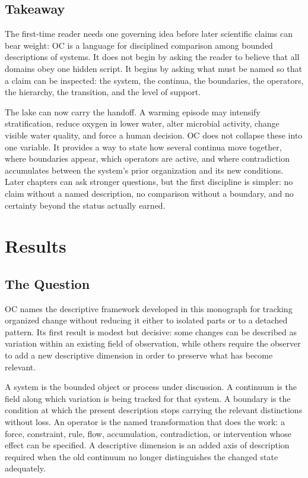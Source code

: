 \documentclass[11pt,a4paper,openany]{book}
\begin{document}
\subsection{Takeaway}
The first-time reader needs one governing idea before later scientific claims can bear weight: OC is a language for disciplined comparison among bounded descriptions of systems. It does not begin by asking the reader to believe that all domains obey one hidden script. It begins by asking what must be named so that a claim can be inspected: the system, the continua, the boundaries, the operators, the hierarchy, the transition, and the level of support. \cite{wilson_renormalization,landau_stat_physics}\par
The lake can now carry the handoff. A warming episode may intensify stratification, reduce oxygen in lower water, alter microbial activity, change visible water quality, and force a human decision. OC does not collapse these into one variable. It provides a way to state how several continua move together, where boundaries appear, which operators are active, and where contradiction accumulates between the system's prior organization and its new conditions. Later chapters can ask stronger questions, but the first discipline is simpler: no claim without a named description, no comparison without a boundary, and no certainty beyond the status actually earned.\par
\section{Results}
\subsection{The Question}
OC names the descriptive framework developed in this monograph for tracking organized change without reducing it either to isolated parts or to a detached pattern. Its first result is modest but decisive: some changes can be described as variation within an existing field of observation, while others require the observer to add a new descriptive dimension in order to preserve what has become relevant. \cite{landau_stat_physics,prigogine_dissipative}\par
A system is the bounded object or process under discussion. A continuum is the field along which variation is being tracked for that system. A boundary is the condition at which the present description stops carrying the relevant distinctions without loss. An operator is the named transformation that does the work: a force, constraint, rule, flow, accumulation, contradiction, or intervention whose effect can be specified. A descriptive dimension is an added axis of description required when the old continuum no longer distinguishes the changed state adequately.\par
\end{document}
